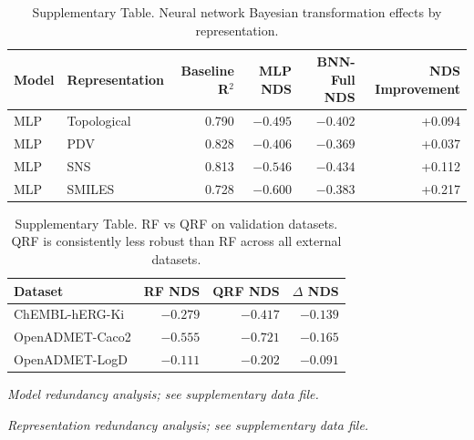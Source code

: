 \documentclass[pdflatex,sn-mathphys-num]{sn-jnl}%
\theoremstyle{thmstyleone}%
\theoremstyle{thmstyletwo}%
\theoremstyle{thmstylethree}%
\begin{document}
\begin{appendices}
\begin{table}[h]
\centering
\caption{Supplementary Table. Neural network Bayesian transformation effects by representation.}
\label{tab:supp_nn_transforms}
\small
\begin{tabular}{llrrrr}
\toprule
\textbf{Model} & \textbf{Representation} & \textbf{Baseline R$^2$} & \textbf{MLP NDS} & \textbf{BNN-Full NDS} & \textbf{NDS Improvement} \\
\midrule
MLP & Topological & 0.790 & $-0.495$ & $-0.402$ & +0.094 \\
MLP & PDV & 0.828 & $-0.406$ & $-0.369$ & +0.037 \\
MLP & SNS & 0.813 & $-0.546$ & $-0.434$ & +0.112 \\
MLP & SMILES & 0.728 & $-0.600$ & $-0.383$ & +0.217 \\
\bottomrule
\end{tabular}
\end{table}

\begin{table}[h]
\centering
\caption{Supplementary Table. RF vs QRF on validation datasets. QRF is consistently less robust than RF across all external datasets.}
\label{tab:supp_validation_probabilistic}
\small
\begin{tabular}{lrrr}
\toprule
\textbf{Dataset} & \textbf{RF NDS} & \textbf{QRF NDS} & \textbf{$\Delta$ NDS} \\
\midrule
ChEMBL-hERG-Ki     & $-0.279$ & $-0.417$ & $-0.139$ \\
OpenADMET-Caco2    & $-0.555$ & $-0.721$ & $-0.165$ \\
OpenADMET-LogD     & $-0.111$ & $-0.202$ & $-0.091$ \\
\bottomrule
\end{tabular}
\end{table}

\begin{table}[h]
\centering
\caption{Supplementary Table. Pairwise Spearman rank correlations between model NDS profiles. Models with $\rho > 0.99$ were excluded from the ANOVA as near-duplicates. Available as \texttt{table\_supp\_model\_redundancy.csv}.}
\label{tab:supp_model_redundancy}
\small
\textit{Model redundancy analysis; see supplementary data file.}
\end{table}

\begin{table}[h]
\centering
\caption{Supplementary Table. Pairwise Spearman rank correlations between representation NDS profiles. Representations with $\rho > 0.90$ were excluded from the ANOVA. Available as \texttt{table\_supp\_rep\_redundancy.csv}.}
\label{tab:supp_rep_redundancy}
\small
\textit{Representation redundancy analysis; see supplementary data file.}
\end{table}


\end{appendices}
\end{document}
